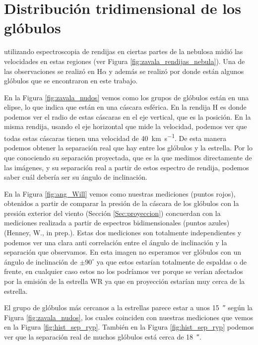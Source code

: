 \documentclass{book}
\begin{document}

\section{Distribución tridimensional de los glóbulos} \label{sec: distrtibucion}

\cite{Zavala:2022} utilizando espectroscopia de rendijas en ciertas partes de la nebulosa midió las velocidades en estas regiones (ver Figura \ref{fig:zavala_rendijas_nebula}). Una de las observaciones se realizó en H$\alpha$ y además se realizó por donde están algunos glóbulos que se encontraron en este trabajo. 

En la Figura \ref{fig:zavala_nudos} vemos como los grupos de glóbulos están en una elipse, lo que indica que están en una cáscara esférica. En la rendija H es donde podemos ver el radio de estas cáscaras en el eje vertical, que es la posición. En la misma rendija, usando el eje horizontal que mide la velocidad, podemos ver que todas estas cáscaras tienen una velocidad de \SI{40}{km.s^{-1}}. De esta manera podemos obtener la separación real que hay entre los glóbulos y la estrella. Por lo que conociendo su separación proyectada, que es la que medimos directamente de las imágenes, y su separación real a partir de estos espectro de rendija, podemos saber cuál debería ser su ángulo de inclinación.

En la Figura \ref{fig:ang_Will} vemos como nuestras mediciones (puntos rojos), obtenidos a partir de comparar la presión de la cáscara de los glóbulos con la presión exterior del viento (Sección \ref{Sec:proyeccion}) concuerdan con la mediciones realizada a partir de espectros bidimensionales (puntos azules) (Henney, W., in prep.). Estas dos mediciones son totalmente independientes y podemos ver una clara anti correlación entre el ángulo de inclinación y la separación que observamos. En esta imagen no esperamos ver glóbulos con un ángulo de inclinación de $\pm 90^\circ$ ya que estos estarían totalmente de espaldas o de frente, en cualquier caso estos no los podríamos ver porque se verían afectados por la emisión de la estrella WR ya que en proyección estarían muy cerca de la estrella.

El grupo de glóbulos más cercanos a la estrellas parece estar a unos \SI{15}{\arcsecond} según la Figura \ref{fig:zavala_nudos}, los cuales coinciden con nuestras mediciones que vemos en la Figura \ref{fig:hist_sep_ryp}. También en la Figura \ref{fig:hist_sep_ryp} podemos ver que la separación real de muchos glóbulos está cerca de \SI{18}{\arcsecond}.
\end{document}
